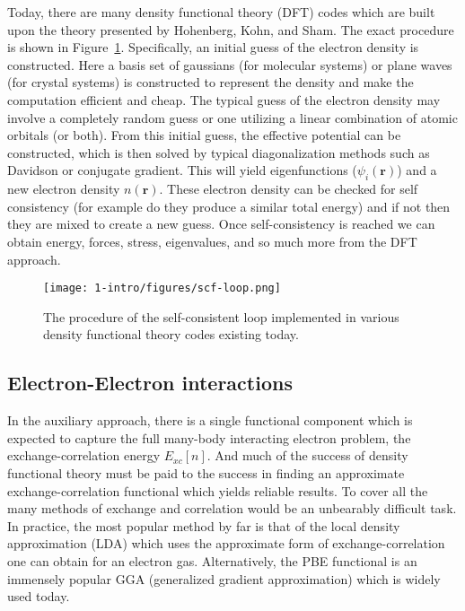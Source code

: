 Today, there are many density functional theory (DFT) codes which are built upon the theory presented by Hohenberg, Kohn, and Sham. The exact procedure is shown in Figure~\ref{intro:fig:scf}. Specifically, an initial guess of the electron density is constructed. Here a basis set of gaussians (for molecular systems) or plane waves (for crystal systems) is constructed to represent the density and make the computation efficient and cheap. The typical guess of the electron density may involve a completely random guess or one utilizing a linear combination of atomic orbitals (or both). From this initial guess, the effective potential can be constructed, which is then solved by typical diagonalization methods such as Davidson or conjugate gradient. This will yield eigenfunctions ($\psi_i(\textbf{r})$) and a new electron density $n(\textbf{r})$. These electron density can be checked for self consistency (for example do they produce a similar total energy) and if not then they are mixed to create a new guess. Once self-consistency is reached we can obtain energy, forces, stress, eigenvalues, and so much more from the DFT approach.

\begin{figure}[h]
\begin{center}
\texttt{[image: 1-intro/figures/scf-loop.png]}
    \caption{The procedure of the self-consistent loop implemented in various density functional theory codes existing today.}  \label{intro:fig:scf}
\end{center}
\end{figure}


\subsection{Electron-Electron interactions}

In the auxiliary approach, there is a single functional component which is expected to capture the full many-body interacting electron problem, the exchange-correlation energy $E_{xc}[n]$. And much of the success of density functional theory must be paid to the success in finding an approximate exchange-correlation functional which yields reliable results.
To cover all the many methods of exchange and correlation would be an unbearably difficult task. In practice, the most popular method by far is that of the local density approximation (LDA) which uses the approximate form of exchange-correlation one can obtain for an electron gas. Alternatively, the PBE functional is an immensely popular GGA (generalized gradient approximation) which is widely used today.~\cite{perdew1996generalized}

